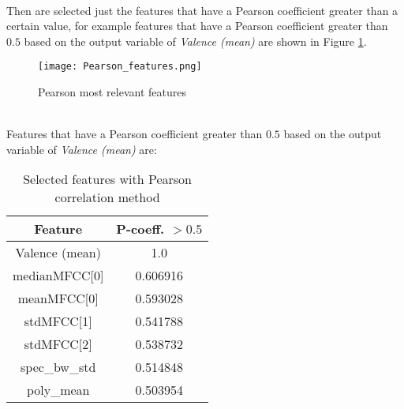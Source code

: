 \\
Then are selected just the features that have a Pearson coefficient greater than a certain value, for example features that have a Pearson coefficient greater than $0.5$ based on the output variable of \textit{Valence (mean)} are shown in Figure \ref{fig:Pearson_features}.
\begin{figure}[h]
    \centering
    \texttt{[image: Pearson\_features.png]} 
	\caption{Pearson most relevant features}
    \label{fig:Pearson_features}
\end{figure}
\\
Features that have a Pearson coefficient greater than $0.5$ based on the output variable of \textit{Valence (mean)} are:
\begin{table}[h!]
	\centering
	\begin{tabular}{|c|c|}
		\hline
		Feature & P-coeff. $>0.5$ \\ [0.5ex] 
		\hline\hline Valence (mean) & 1.0 \\
		\hline medianMFCC[0] & 0.606916 \\
		\hline meanMFCC[0] & 0.593028 \\
		\hline stdMFCC[1] & 0.541788 \\
		\hline stdMFCC[2] & 0.538732 \\
		\hline spec\_bw\_std & 0.514848 \\
		\hline poly\_mean & 0.503954 \\
		\hline
	\end{tabular}
	\caption{Selected features with Pearson correlation method}
	\label{table:Pearson_features}
\end{table}

